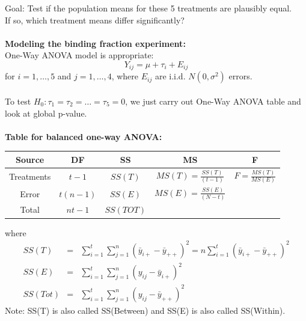Goal: Test if the population means for these 5 treatments are plausibly equal. \\
If so, which treatment means differ significantly? \\~\\
\textbf{Modeling the binding fraction experiment:}\\
One-Way ANOVA model is appropriate: 
$$Y_{ij} = \mu + \tau_i + E_{ij}$$
for $i=1,\ldots,5$ and $j=1,\ldots,4$, where $E_{ij}$ are i.i.d. $N(0,\sigma^2)$ errors. \\~\\

To test $H_0: \tau_1 = \tau_2 = \ldots = \tau_5 =0$, we just carry out One-Way ANOVA table and look at global p-value.\\~\\
\textbf{Table for balanced one-way ANOVA:}
\begin{center}
\begin{tabular}{|c|c|c|c|c|} \hline
Source & DF & SS & MS & F \\ \hline
Treatments & $t-1$ & $SS(T)$ & $MS(T)=\frac{SS(T)}{(t-1)}$ & $F=\frac{MS(T)}{MS(E)}$ \\ 
Error & $t(n-1)$ & $SS(E)$ & $MS(E)=\frac{SS(E)}{(N-t)}$ & \\
Total & $nt-1$ & $SS(TOT)$ & &\\ \hline
\end{tabular}
\end{center}
where
\begin{eqnarray*}
SS(T) & = &\sum_{i=1}^{t} \sum_{j=1}^{n} (\bar{y}_{i+} - \bar{y}_{++})^2 = n\sum_{i=1}^{t}(\bar{y}_{i+} - \bar{y}_{++})^2\\
SS(E) & = & \sum_{i=1}^{t} \sum_{j=1}^{n}(y_{ij}-\bar{y}_{i+})^2 \\
SS(Tot)&=& \sum_{i=1}^{t} \sum_{j=1}^{n}(y_{ij}-\bar{y}_{++})^2
\end{eqnarray*}
Note:  SS(T) is also called SS(Between) and SS(E) is also called SS(Within).\\~\\

\newpage

